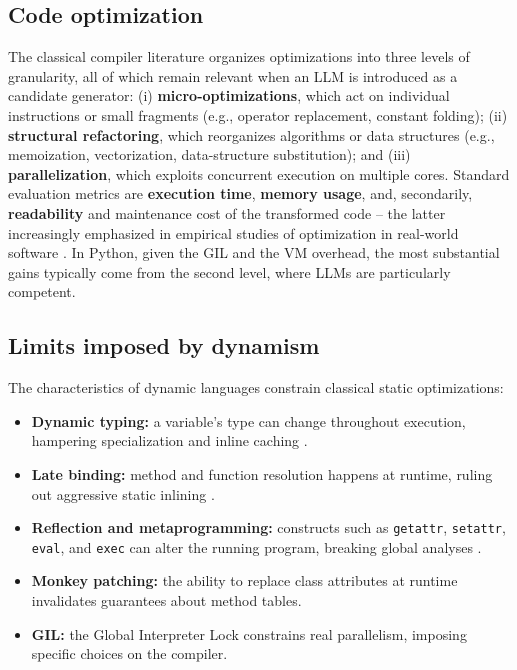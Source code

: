 \documentclass[conference]{IEEEtran}
\begin{document}
\subsection{Code optimization}
The classical compiler literature \cite{DBLP:books/aw/AhoLSU06,DBLP:books/mk/CooperT11} organizes optimizations into three levels of granularity, all of which remain relevant when an LLM is introduced as a candidate generator: (i) \textbf{micro-optimizations}, which act on individual instructions or small fragments (e.g., operator replacement, constant folding); (ii) \textbf{structural refactoring}, which reorganizes algorithms or data structures (e.g., memoization, vectorization, data-structure substitution); and (iii) \textbf{parallelization}, which exploits concurrent execution on multiple cores. Standard evaluation metrics are \textbf{execution time}, \textbf{memory usage}, and, secondarily, \textbf{readability} and maintenance cost of the transformed code -- the latter increasingly emphasized in empirical studies of optimization in real-world software \cite{DBLP:conf/icse/SelakovicP16,DBLP:conf/msr/NistorJT13}. In Python, given the GIL and the VM overhead, the most substantial gains typically come from the second level, where LLMs are particularly competent.

\subsection{Limits imposed by dynamism}
The characteristics of dynamic languages constrain classical static optimizations:
\begin{itemize}
  \item \textbf{Dynamic typing:} a variable's type can change throughout execution, hampering specialization and inline caching \cite{DBLP:conf/pldi/RichardsLBV10}.
  \item \textbf{Late binding:} method and function resolution happens at runtime, ruling out aggressive static inlining \cite{DBLP:conf/dls/AkerblomW15}.
  \item \textbf{Reflection and metaprogramming:} constructs such as \texttt{getattr}, \texttt{setattr}, \texttt{eval}, and \texttt{exec} can alter the running program, breaking global analyses \cite{DBLP:conf/acsc/HolknerH09}.
  \item \textbf{Monkey patching:} the ability to replace class attributes at runtime invalidates guarantees about method tables.
  \item \textbf{GIL:} the Global Interpreter Lock constrains real parallelism, imposing specific choices on the compiler.
\end{itemize}
\end{document}
